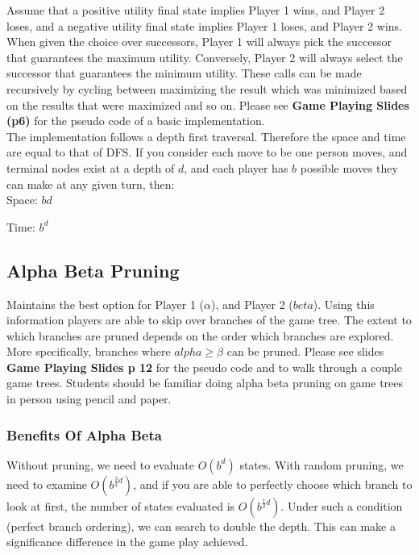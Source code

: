 \documentclass[letterpaper]{article} %
\begin{document}
Assume that a positive utility final state implies Player 1 wins, and Player 2 loses, and a negative utility final state implies Player 1 loses, and Player 2 wins. When given the choice over successors, Player 1 will always pick the successor that guarantees the maximum utility. Conversely, Player 2 will always select the successor that guarantees the minimum utility. These calls can be made recursively by cycling between maximizing the result which was minimized based on the results that were maximized and so on. Please see \textbf{Game Playing Slides (p6)} for the pseudo code of a basic implementation.\\

The implementation follows a depth first traversal. Therefore the space and time are equal to that of DFS. If you consider each move to be one person moves, and terminal nodes exist at a depth of $d$, and each player has $b$ possible moves they can make at any given turn, then:\\

Space: $bd$

Time: $b^d$

\subsection{Alpha Beta Pruning}

Maintains the best option for Player 1 ($\alpha$), and Player 2 ($beta$). Using this information players are able to skip over branches of the game tree. The extent to which branches are pruned depends on the order which branches are explored. More specifically, branches where $alpha \ge \beta$ can be pruned. Please see slides \textbf{Game Playing Slides p 12} for the pseudo code and to walk through a couple game trees. Students should be familiar doing alpha beta pruning on game trees in person using pencil and paper.

\subsubsection{Benefits Of Alpha Beta}

Without pruning, we need to evaluate $O(b^d)$ states. With random pruning, we need to examine $O(b^{\frac{3}{4}d})$, and if you are able to perfectly choose which branch to look at first, the number of states evaluated is $O(b^{\frac{1}{2}d})$. Under such a condition (perfect branch ordering), we can search to double the depth. This can make a significance difference in the game play achieved.
\end{document}

